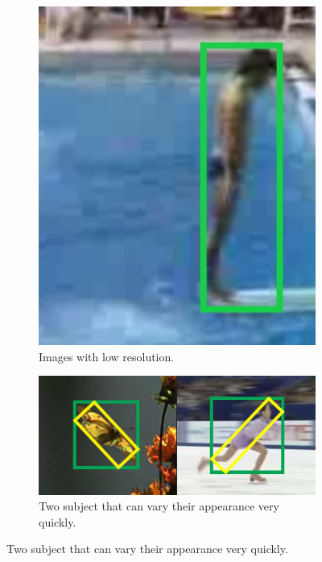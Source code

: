 \begin{figure}[!h]
	\centering
	\begin{subfigure}[!h]{0.19\textwidth}
		\includegraphics[width=\linewidth]{images/tracking/challenge_lowResolution}
		\caption{Images with low resolution.}
		\label{fig:challenge_lowResolution}
	\end{subfigure}
	\begin{subfigure}[!h]{0.54\textwidth}
		\includegraphics[width=\linewidth]{images/tracking/challenge_deformation}
		\captionsetup{margin=0.5cm}
		\caption{Two subject that can vary their appearance very quickly.}

\end{subfigure}
\end{figure}
